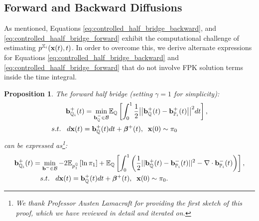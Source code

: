 \documentclass[a4paper,12pt,twoside,openright]{report}
\newtheorem{proposition}{Proposition}
\theoremstyle{definition}
\begin{document}
\subsection{Forward and Backward Diffusions}

As mentioned, Equations \ref{eq:controlled_half_bridge_backward}, and \ref{eq:controlled_haalf_bridge_forward} exhibit the computational challenge of estimating $p^{{\mathbb{X}}_{i}}({\mathbf{x}}(t), t)$. In order to overcome this, we derive alternate expressions for Equations \ref{eq:controlled_half_bridge_backward} and \ref{eq:controlled_haalf_bridge_forward} that do not involve FPK solution terms inside the time integral.
\begin{proposition}\label{prop:halfforcontrol}
The forward half bridge (setting $\gamma=1$  for simplicity):
\begin{align*} 
   {\mathbf{b}}^{+}_{{\mathbb{Q}}_{i}}(t) =\min_{{\mathbf{b}}_{\mathbb{Q}}^{-} \in {\mathcal{B}} } & \mathbb{E}_{\mathbb{Q}}\left[\int_0^1 \frac{1}{2}\big|\big|{\mathbf{b}}_{\mathbb{Q}}^{+}(t) -{\mathbf{b}}^{+}_{{\mathbb{P}}_{i}}(t)\big|\big|^2 dt\right], \nonumber \\
    s.t.\;\;\; d{\mathbf{x}}(t) = {\mathbf{b}}_{\mathbb{Q}}^{+}(t) &dt +  {\bm{\beta}}^{+}(t), \;\; {\mathbf{x}}(0) \sim \pi_0
\end{align*}
can be expressed as\footnote{We thank Professor Austen Lamacraft for providing the first sketch of this proof, which we have reviewed in detail and iterated on.}:
\begin{align} \label{eq:div_control_forward}
   {\mathbf{b}}^{+}_{{\mathbb{Q}}_{i}}(t) =\min_{{\mathbf{b}}^{-} \in {\mathcal{B}} } -2\mathbb{E}_{p^{{\mathbb{Q}}}_1}\left[\operatorname{ln} \pi_1 \right] &+ \mathbb{E}_{{\mathbb{Q}}}\left[\int_0^1 \left(\frac{1}{2}||{\mathbf{b}}_{\mathbb{Q}}^{+}(t) -{\mathbf{b}}_{{\mathbb{P}}_{i}}^{-}(t)||^2 - \nabla\cdot{\mathbf{b}}^{-}_{{\mathbb{P}}_{i}}(t) \right)\right], \nonumber \\
    s.t.\;\;\; d{\mathbf{x}}(t) = {\mathbf{b}}_{\mathbb{Q}}^{+}(t) &dt + {\bm{\beta}}^{+}(t), \;\; {\mathbf{x}}(0) \sim \pi_0.
\end{align}
\end{proposition}
\end{document}
